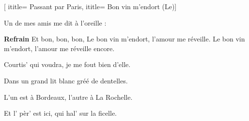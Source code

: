  [
ititle= {Passant par Paris},
ititle= {Bon vin m'endort (Le)}]

\beginverse
{}
Un de mes amis me dit à l'oreille :
\endverse

\beginchorus
\textbf {Refrain}
Et bon, bon, bon,
Le bon vin m'endort, l'amour me réveille.
Le bon vin m'endort, l'amour me réveille encore.
\endchorus

\beginverse
{}
Courtis' qui voudra, je me fout bien d'elle.
\endverse

\beginverse
{}
Dans un grand lit blanc gréé de dentelles.
\endverse

\beginverse
{}
L'un est à Bordeaux, l'autre à La Rochelle.
\endverse

\beginverse
{}
Et l' pèr' est ici, qui hal' sur la ficelle.
\endverse

\endsong